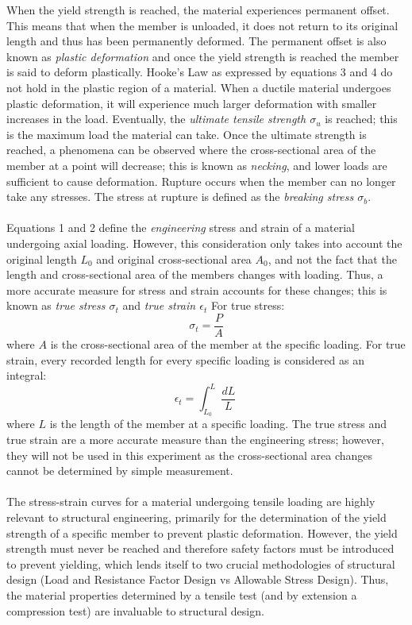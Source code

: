 \documentclass{article}
\begin{document}
    When the yield strength is reached, the material experiences permanent offset. This means that when the member  is unloaded, it does not return to its original length and thus has been permanently deformed. The permanent offset is also known as \emph{plastic deformation} and once the yield strength is reached the member is said to deform plastically. Hooke's Law as expressed by equations 3 and 4 do not hold in the plastic region of a material. When a ductile material undergoes plastic deformation, it will experience much larger deformation with smaller increases in the load. Eventually, the \emph{ultimate tensile strength $\sigma_{u}$} is reached; this is the maximum load the material can take. Once the ultimate strength is reached, a phenomena can be observed where the cross-sectional area of the member at a point will decrease; this is known as \emph{necking}, and lower loads are sufficient to cause deformation. Rupture occurs when the member can no longer take any stresses. The stress at rupture is defined as the \emph{breaking stress $\sigma_{b}$}.\\\\
    Equations 1 and 2 define the \emph{engineering} stress and strain of a material undergoing axial loading. However, this consideration only takes into account the original length $L_{0}$ and original cross-sectional area $A_{0}$, and not the fact that the length and cross-sectional area of the members changes with loading. Thus, a more accurate measure for stress and strain accounts for these changes; this is known as \emph{true stress $\sigma_{t}$ } and \emph{true strain $\epsilon_{t}$ } For true stress:
    \begin{equation}
        \sigma_{t} = \frac{P}{A} 
    \end{equation}
    where $A$ is the cross-sectional area of the member at the specific loading. For true strain, every recorded length for every specific loading is considered as an integral:
    \begin{equation}
        \epsilon_{t} = \int_{L_{0}}^{L}\frac{dL}{L}\
    \end{equation}
    where $L$ is the length of the member at a specific loading. The true stress and true strain are a more accurate measure than the engineering stress; however, they will not be used in this experiment as the cross-sectional area changes cannot be determined by simple measurement. \\\\
    The stress-strain curves for a material undergoing  tensile loading are highly relevant to structural engineering, primarily for the determination of the yield strength of a specific member to prevent plastic deformation. However, the yield strength must never be reached and therefore safety factors must be introduced to prevent yielding, which lends itself to two crucial methodologies of structural design (Load and Resistance Factor Design vs Allowable Stress Design). Thus, the material properties determined by a tensile test (and by extension a compression test) are invaluable to structural design.
    \newpage
\end{document}
